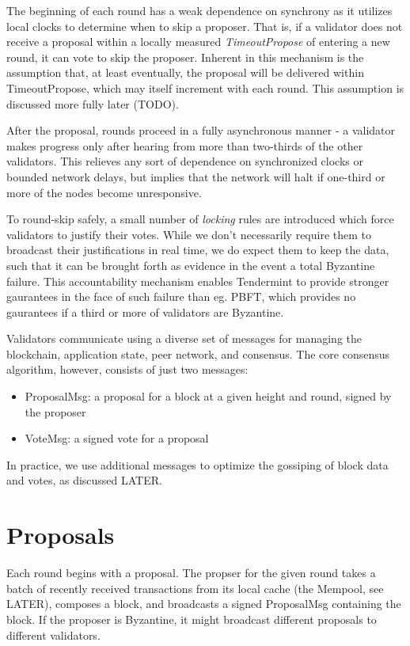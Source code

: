 The beginning of each round has a weak dependence on synchrony as it utilizes local clocks to determine when to skip a proposer.
That is, if a validator does not receive a proposal within a locally measured \emph{TimeoutPropose} of entering a new round, it can vote to skip the proposer.
Inherent in this mechanism is the assumption that, at least eventually, the proposal will be delivered within TimeoutPropose, which may itself increment with each round.
This assumption is discussed more fully later (TODO).

After the proposal, rounds proceed in a fully asynchronous manner - a validator makes progress only after hearing from more than two-thirds of the other validators.
This relieves any sort of dependence on synchronized clocks or bounded network delays,
but implies that the network will halt if one-third or more of the nodes become unresponsive.

To round-skip safely, a small number of \emph{locking} rules are introduced which force validators to justify their votes.
While we don't necessarily require them to broadcast their justifications in real time, we do expect them to keep the data,
such that it can be brought forth as evidence in the event a total Byzantine failure.
This accountability mechanism enables Tendermint to provide stronger gaurantees in the face of such failure than eg. PBFT,
which provides no gaurantees if a third or more of validators are Byzantine.

Validators communicate using a diverse set of messages for managing the blockchain, application state, peer network, and consensus.
The core consensus algorithm, however, consists of just two messages:

\begin{itemize}
\item{ProposalMsg: a proposal for a block at a given height and round, signed by the proposer}
\item{VoteMsg: a signed vote for a proposal}
\end{itemize}

In practice, we use additional messages to optimize the gossiping of block data and votes, as discussed LATER.

\section{Proposals}

Each round begins with a proposal. 
The propser for the given round takes a batch of recently received transactions from its local cache (the Mempool, see LATER), 
composes a block, and broadcasts a signed ProposalMsg containing the block.
If the proposer is Byzantine, it might broadcast different proposals to different validators.

